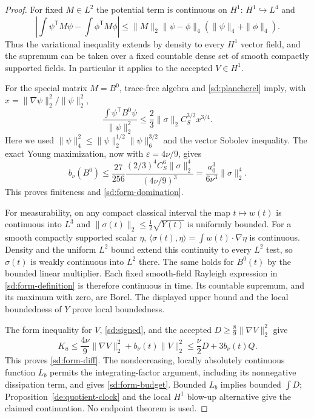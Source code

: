 \begin{proof}
For fixed $M\in L^2$ the potential term is continuous on $H^1$:
$H^1\hookrightarrow L^4$ and
\[
 \left|\int\psi^{\mathsf T}M\psi-\int\phi^{\mathsf T}M\phi\right|
 \le\|M\|_2\|\psi-\phi\|_4(\|\psi\|_4+\|\phi\|_4).
\]
Thus the variational inequality extends by density to every $H^1$
vector field, and the supremum can be taken over a fixed countable
dense set of smooth compactly supported fields. In particular it
applies to the accepted $V\in H^1$.

For the special matrix $M=B^0$, trace-free algebra and
\eqref{sd:plancherel} imply, with $x=\|\nabla\psi\|_2^2/\|\psi\|_2^2$,
\[
 \frac{\int\psi^{\mathsf T}B^0\psi}{\|\psi\|_2^2}
 \le\frac23\|\sigma\|_2 C_S^{3/2}x^{3/4}.
\]
Here we used $\|\psi\|_4^2\le
\|\psi\|_2^{1/2}\|\psi\|_6^{3/2}$ and the vector Sobolev inequality.
The exact Young maximization, now with $\varepsilon=4\nu/9$, gives
\[
 b_\nu(B^0)\le\frac{27}{256}
 \frac{(2/3)^4 C_S^6\|\sigma\|_2^4}{(4\nu/9)^3}
 =\frac{a_0^3}{6\nu^3}\|\sigma\|_2^4.
\]
This proves finiteness and \eqref{sd:form-domination}.

For measurability, on any compact classical interval the map
$t\mapsto w(t)$ is continuous into $L^3$ and
$\|\sigma(t)\|_2\le\frac12\sqrt{Y(t)}$ is uniformly bounded.
For a smooth compactly supported scalar $\eta$,
$\langle\sigma(t),\eta\rangle=\int w(t)\cdot\nabla\eta$ is continuous.
Density and the uniform $L^2$ bound extend this continuity to every
$L^2$ test, so $\sigma(t)$ is weakly continuous into $L^2$ there.
The same holds for $B^0(t)$ by the bounded linear multiplier.
Each fixed smooth-field Rayleigh expression in
\eqref{sd:form-definition} is therefore continuous in time. Its
countable supremum, and its maximum with zero, are Borel. The displayed
upper bound and the local boundedness of $Y$ prove local boundedness.

The form inequality for $V$, \eqref{sd:signed}, and the accepted
$D\ge\frac89\|\nabla V\|_2^2$ give
\[
 K_u\le\frac{4\nu}{9}\|\nabla V\|_2^2+b_\nu(t)\|V\|_2^2
 \le\frac\nu2D+3b_\nu(t)Q.
\]
This proves \eqref{sd:form-diff}. The nondecreasing, locally absolutely
continuous function $L_b$ permits the integrating-factor argument,
including its nonnegative dissipation term, and gives
\eqref{sd:form-budget}. Bounded $L_b$ implies bounded $\int D$;
Proposition~\ref{de:quotient-clock} and the local $H^1$ blow-up
alternative give the claimed continuation. No endpoint theorem is used.
\end{proof}

